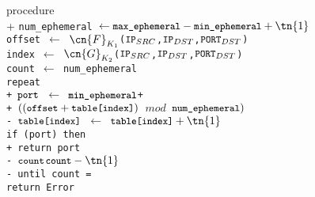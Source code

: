 
\begin{algorithm}{}{\thetcbcounter}\label{alg:dhps_port_selection}
	\begin{pseudo}[indent-mark,kw,hl-warn=false]
		procedure  \\+
		\tt{num\_ephemeral} $\leftarrow \tt{max\_ephemeral} - \tt{min\_ephemeral}+\tn{1}$ \\
    \tt{offset} $\leftarrow$ $\cn{F}_{K_1}$($\tt{IP}_{SRC}$,$\tt{IP}_{DST}$,$\tt{PORT}_{DST}$) \\
    \tt{index} $\leftarrow$ $\cn{G}_{K_2}$($\tt{IP}_{SRC}$,$\tt{IP}_{DST}$,$\tt{PORT}_{DST}$) \\
		\tt{count} $\leftarrow$ \tt{num\_ephemeral} \\
		repeat \\+
		$\tt{port}$ $\leftarrow$ $\tt{min\_ephemeral}$+\\+
		$((\tt{offset}+\tt{table[index]})$ $mod$ $\tt{num\_ephemeral})$ \\-
		$\tt{table[index]}$ $\leftarrow$ $\tt{table[index]} +\tn{1}$ \\
		if (\tt{port}) then \\+
		return \tt{port} \\-
		$\tt{count} $\leftarrow$ \tt{count} - \tn{1}$ \\-
		until \tt{count} =  \\
		return \tt{Error}\\
	\end{pseudo}
\end{algorithm}
